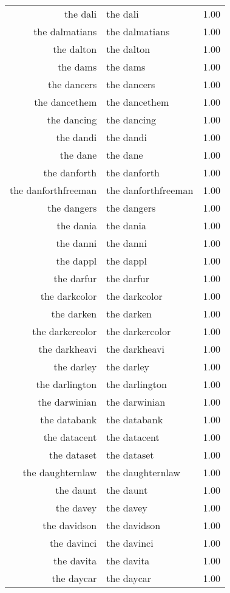 \begin{table}[ht]
\begin{tabular}{rlr}
  the dali & the dali & 1.00 \\ 
  the dalmatians & the dalmatians & 1.00 \\ 
  the dalton & the dalton & 1.00 \\ 
  the dams & the dams & 1.00 \\ 
  the dancers & the dancers & 1.00 \\ 
  the dancethem & the dancethem & 1.00 \\ 
  the dancing & the dancing & 1.00 \\ 
  the dandi & the dandi & 1.00 \\ 
  the dane & the dane & 1.00 \\ 
  the danforth & the danforth & 1.00 \\ 
  the danforthfreeman & the danforthfreeman & 1.00 \\ 
  the dangers & the dangers & 1.00 \\ 
  the dania & the dania & 1.00 \\ 
  the danni & the danni & 1.00 \\ 
  the dappl & the dappl & 1.00 \\ 
  the darfur & the darfur & 1.00 \\ 
  the darkcolor & the darkcolor & 1.00 \\ 
  the darken & the darken & 1.00 \\ 
  the darkercolor & the darkercolor & 1.00 \\ 
  the darkheavi & the darkheavi & 1.00 \\ 
  the darley & the darley & 1.00 \\ 
  the darlington & the darlington & 1.00 \\ 
  the darwinian & the darwinian & 1.00 \\ 
  the databank & the databank & 1.00 \\ 
  the datacent & the datacent & 1.00 \\ 
  the dataset & the dataset & 1.00 \\ 
  the daughternlaw & the daughternlaw & 1.00 \\ 
  the daunt & the daunt & 1.00 \\ 
  the davey & the davey & 1.00 \\ 
  the davidson & the davidson & 1.00 \\ 
  the davinci & the davinci & 1.00 \\ 
  the davita & the davita & 1.00 \\ 
  the daycar & the daycar & 1.00 \\ 

\end{tabular}
\end{table}
